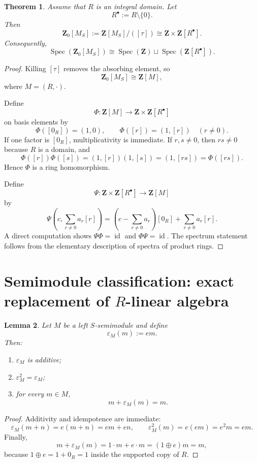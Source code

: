 \documentclass[11pt]{amsart}
\numberwithin{equation}{section}
\newtheorem{theorem}{Theorem}[section]
\newtheorem{lemma}[theorem]{Lemma}
\theoremstyle{definition}
\newcommand{\Spec}{\operatorname{Spec}}
\newcommand{\id}{\operatorname{id}}
\newcommand{\Z}{\mathbf Z}
\begin{document}
\begin{theorem}\label{thm:contracted-monoid-algebra}
Assume that $R$ is an integral domain. Let
\[
R^{\bullet}:=R\setminus\{0\}.
\]
Then
\[
\Z_0[M_S]:=\Z[M_S]/([\tau])\cong \Z\times \Z[R^{\bullet}].
\]
Consequently,
\[
\Spec(\Z_0[M_S])\cong \Spec(\Z)\sqcup \Spec(\Z[R^{\bullet}]).
\]
\end{theorem}

\begin{proof}
Killing $[\tau]$ removes the absorbing element, so
\[
\Z_0[M_S]\cong \Z[M],
\]
where $M=(R,\cdot)$.

Define
\[
\Phi:\Z[M]\to \Z\times \Z[R^{\bullet}]
\]
on basis elements by
\[
\Phi([0_R])=(1,0),
\qquad
\Phi([r])=(1,[r])
\quad(r\neq0).
\]
If one factor is $[0_R]$, multiplicativity is immediate. If $r,s\neq0$, then $rs\neq0$ because $R$ is a domain, and
\[
\Phi([r])\Phi([s])=(1,[r])(1,[s])=(1,[rs])=\Phi([rs]).
\]
Hence $\Phi$ is a ring homomorphism.

Define
\[
\Psi:\Z\times \Z[R^{\bullet}]\to \Z[M]
\]
by
\[
\Psi\!\left(c,\sum_{r\neq0}a_r[r]\right)=
\left(c-\sum_{r\neq0}a_r\right)[0_R]+\sum_{r\neq0}a_r[r].
\]
A direct computation shows $\Psi\Phi=\id$ and $\Phi\Psi=\id$. The spectrum statement follows from the elementary description of spectra of product rings. 
\end{proof}

\section{Semimodule classification: exact replacement of $R$-linear algebra}

\begin{lemma}\label{lem:epsilon-basic}
Let $M$ be a left $S$-semimodule and define
\[
\varepsilon_M(m):=em.
\]
Then:
\begin{enumerate}[label=(\arabic*)]
    \item $\varepsilon_M$ is additive;
    \item $\varepsilon_M^2=\varepsilon_M$;
    \item for every $m\in M$,
    \[
    m+\varepsilon_M(m)=m.
    \]
\end{enumerate}
\end{lemma}

\begin{proof}
Additivity and idempotence are immediate:
\[
\varepsilon_M(m+n)=e(m+n)=em+en,
\qquad
\varepsilon_M^2(m)=e(em)=e^2m=em.
\]
Finally,
\[
m+\varepsilon_M(m)=1\cdot m+e\cdot m=(1\oplus e)m=m,
\]
because $1\oplus e=1+0_R=1$ inside the supported copy of $R$. 
\end{proof}
\end{document}
